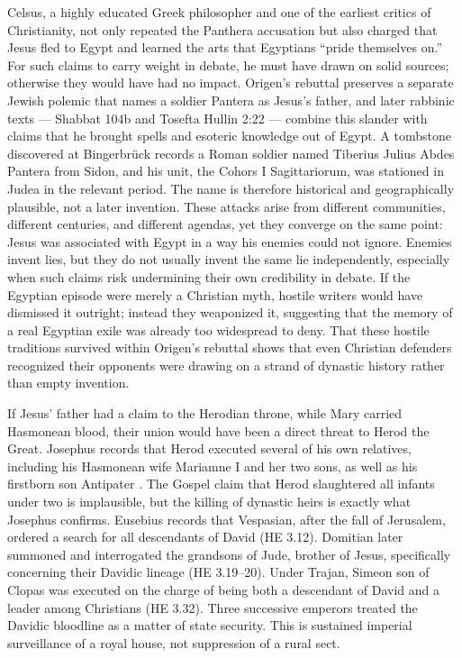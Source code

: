 Celsus, a highly educated Greek philosopher and one of the earliest critics of Christianity, not only repeated the Panthera accusation but also charged that Jesus fled to Egypt and learned the arts that Egyptians ``pride themselves on.''
For such claims to carry weight in debate, he must have drawn on solid sources; otherwise they would have had no impact.
Origen's rebuttal \cite[1.32]{origen:contracels} preserves a separate Jewish polemic that names a soldier Pantera as Jesus's father, and later rabbinic texts --- Shabbat 104b and Tosefta Hullin 2:22 --- combine this slander with claims that he brought spells and esoteric knowledge out of Egypt.
A tombstone discovered at Bingerbrück records a Roman soldier named Tiberius Julius Abdes Pantera from Sidon, and his unit, the Cohors I Sagittariorum, was stationed in Judea in the relevant period.
The name is therefore historical and geographically plausible, not a later invention.
These attacks arise from different communities, different centuries, and different agendas, yet they converge on the same point: Jesus was associated with Egypt in a way his enemies could not ignore.
Enemies invent lies, but they do not usually invent the same lie independently, especially when such claims risk undermining their own credibility in debate.
If the Egyptian episode were merely a Christian myth, hostile writers would have dismissed it outright; instead they weaponized it, suggesting that the memory of a real Egyptian exile was already too widespread to deny.
That these hostile traditions survived within Origen's rebuttal shows that even Christian defenders recognized their opponents were drawing on a strand of dynastic history rather than empty invention.

If Jesus’ father had a claim to the Herodian throne, while Mary carried Hasmonean blood, their union would have been a direct threat to Herod the Great.
Josephus records that Herod executed several of his own relatives, including his Hasmonean wife Mariamne I and her two sons, as well as his firstborn son Antipater \cite[15.232; 16.394]{josephus:ant}.
The Gospel claim that Herod slaughtered all infants under two is implausible, but the killing of dynastic heirs is exactly what Josephus confirms.
Eusebius records that Vespasian, after the fall of Jerusalem, ordered a search for all descendants of David (HE 3.12).
Domitian later summoned and interrogated the grandsons of Jude, brother of Jesus, specifically concerning their Davidic lineage (HE 3.19--20).
Under Trajan, Simeon son of Clopas was executed on the charge of being both a descendant of David and a leader among Christians (HE 3.32).
Three successive emperors treated the Davidic bloodline as a matter of state security.
This is sustained imperial surveillance of a royal house, not suppression of a rural sect.

